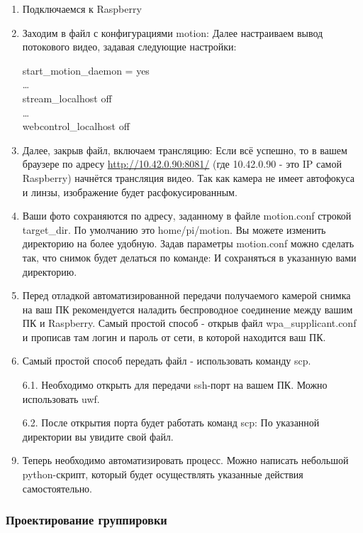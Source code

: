 \begin{enumerate}
    \item Подключаемся к Raspberry
    \item Заходим в файл с конфигурациями motion:
    Далее настраиваем вывод потокового видео, задавая следующие настройки:
    
    start\_motion\_daemon = yes\\
    \dots\\
    stream\_localhost off\\
    \dots\\
    webcontrol\_localhost off
    \item Далее, закрыв файл, включаем трансляцию:
    Если всё успешно, то в вашем браузере по адресу \url{http://10.42.0.90:8081/} (где 10.42.0.90 - это IP самой Raspberry) начнётся трансляция видео.
    Так как камера не имеет автофокуса и линзы, изображение будет расфокусированным.
    \item  Ваши фото сохраняются по адресу, заданному в файле motion.conf строкой target\_dir. По умолчанию это home/pi/motion. Вы можете изменить директорию на более удобную. Задав параметры motion.conf можно сделать так, что снимок будет делаться по команде:
    И сохраняться в указанную вами директорию.
    \item Перед отладкой автоматизированной передачи получаемого камерой снимка на ваш ПК рекомендуется наладить беспроводное соединение между вашим ПК и Raspberry. Самый простой способ - открыв файл wpa\_supplicant.conf и прописав там логин и пароль от сети, в которой находится ваш ПК.
    \item Самый простой способ передать файл - использовать команду scp. 
    \item[6.1.] Необходимо открыть для передачи ssh-порт на вашем ПК. Можно использовать uwf.
    \item[6.2.] После открытия порта будет работать команд scp:
    По указанной директории вы увидите свой файл.
    \item Теперь необходимо автоматизировать процесс. Можно написать небольшой python-скрипт, который будет осуществлять указанные действия самостоятельно.
\end{enumerate}

\subsubsection*{Проектирование группировки}

